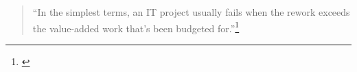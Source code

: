 \begin{quote}
"`In the simplest terms, an IT project usually fails when the rework exceeds the value-added work that's been budgeted for."'\footnote{\parencite[Vgl. Abschnitt: "`Why do projects fail so often?"']{Charette2005}}
\end{quote}







